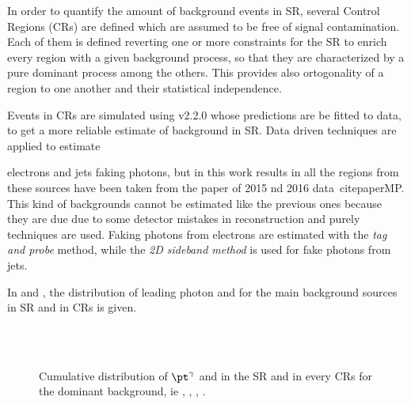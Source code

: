 In order to quantify the amount of background events in SR, several Control Regions (CRs) are defined which are assumed to be free of signal contamination. Each of them is defined reverting one or more constraints for the SR to enrich every region with a given background process, so that they are characterized by a pure dominant process among the others. This provides also ortogonality of a region to one another and their statistical independence.

Events in CRs are simulated using \SHERPA v2.2.0 whose predictions are be fitted to data, to get a more reliable estimate of background in SR. Data driven techniques are applied to estimate


electrons and jets faking photons, but in this work results in all the regions from these sources have been taken from the \mph paper of 2015 nd 2016 data~cite{paperMP}. This kind of backgrounds cannot be estimated like the previous ones because they are due due to some detector mistakes in reconstruction and purely \insitu techniques are used. Faking photons from electrons are estimated with the \emph{tag and probe} method, while the \emph{2D sideband method} is used for fake photons from jets.

In \Fig{\ref{fig:prefit}} and \Fig{\ref{fig:prefitcont}}, the distribution of leading photon \pt and \met for the main background sources in SR and in CRs is given.

\begin{figure}[p]
\centering
{} \quad
{} \\

 \quad
{} \\

\caption{Cumulative distribution of $\pt^{\gamma}$ and \met in the SR and in every CRs for the dominant background, ie \znng, \zg, \wg, \gj.}
\label{fig:prefit}
\end{figure}

